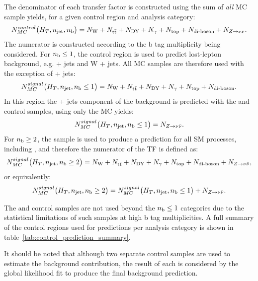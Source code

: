 The denominator of each transfer factor is constructed using the sum of
\textit{all} MC sample yields, for a given control region and
analysis category:
% 
\begin{equation}
N_{MC}^{control}\big(H_T, n_{\text{jet}}, n_{\text{b}}\big) = N_{\text{W}} + N_{\text{t}\bar{\text{t}}} + N_{\text{DY}} + N_{\gamma} + 
N_{\text{top}} + N_{\text{di-boson}} + N_{Z \to \nu\bar{\nu}} .
\label{eq:trans_fact_denom}
\end{equation}
% 
The numerator is constructed according to the b tag multiplicity being 
considered. For $n_{\text{b}} \leq 1$, the \mj control region is used to predict 
lost-lepton background, e.g. \ttbar + jets and W + jets. All MC samples
are therefore used with the exception of \zinv + jets:
% 
\begin{equation}
N_{MC}^{signal}\big(H_T, n_{\text{jet}}, n_{\text{b}} \leq 1\big) = N_{\text{W}} + N_{\text{t}\bar{\text{t}}} + N_{\text{DY}} + N_{\gamma} + 
N_{\text{top}} + N_{\text{di-boson}} .
\label{eq:trans_fact_num_le1b_noz}
\end{equation}
% 
In this \nb region the \zinv + jets component of the background is predicted
with the \mmj and \gj control samples, using only the \zinv MC yields:
% 
\begin{equation}
N_{MC}^{signal}\big(H_T, n_{\text{jet}}, n_{\text{b}} \leq 1 \big) = N_{Z \to \nu\bar{\nu}} .
\label{eq:trans_fact_num_le1b_z}
\end{equation}
%
For $n_{\text{b}} \geq 2$, the \mj sample is used to produce a prediction for all 
SM processes, including \zinv, and therefore the numerator of the TF is defined as:
% 
\begin{equation}
N_{MC}^{signal}\big(H_T, n_{\text{jet}}, n_{\text{b}} \geq 2 \big) = N_{\text{W}} + N_{\text{t}\bar{\text{t}}} + N_{\text{DY}} + N_{\gamma} + 
N_{\text{top}} + N_{\text{di-boson}} + N_{Z \to \nu\bar{\nu}} ,
\label{eq:trans_fact_num_geq2b}
\end{equation}
% 
or equivalently:
% 
\begin{equation}
N_{MC}^{signal}\big(H_T, n_{\text{jet}}, n_{\text{b}} \geq 2 \big) = N_{MC}^{signal}\big(H_T, n_{\text{jet}}, n_{\text{b}} \leq 1\big) + N_{Z \to \nu\bar{\nu}} .
\end{equation}

The \mmj and \gj control samples are not used beyond the $n_{\text{b}} \leq 1$ categories
due to the statistical limitations of such samples at high b tag multiplicities.
A full summary of the control regions used for predictions per analysis category
is shown in table~\ref{tab:control_prediction_summary}.

It should be noted that although two separate control samples are 
used to estimate the \zinv background contribution, the result of each is
considered by the global likelihood fit to produce the final background
prediction.

